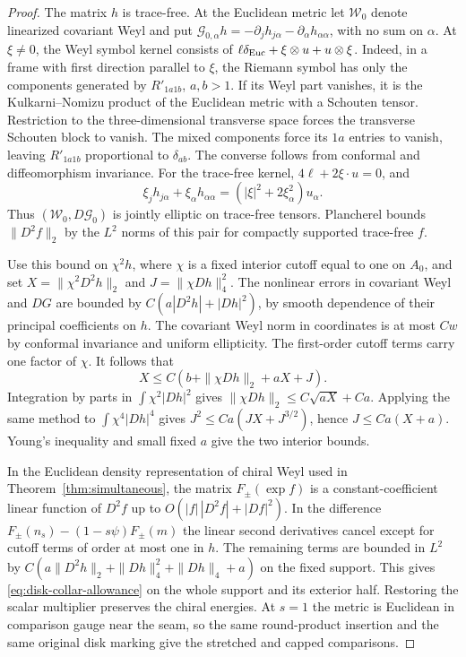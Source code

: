 \begin{proof}
The matrix \(h\) is trace-free. At the Euclidean metric let
\(\mathcal W_0\) denote linearized covariant Weyl and put
\(\mathcal G_{0,\alpha}h=-\partial_jh_{j\alpha}
-\partial_\alpha h_{\alpha\alpha}\), with no sum on \(\alpha\).
At \(\xi\ne0\), the Weyl symbol kernel consists of
\(\ell\delta_{\rm Euc}+\xi\otimes u+u\otimes\xi\). Indeed, in a frame with
first direction parallel to \(\xi\), the Riemann symbol has only
the components generated by \(R'_{1a1b}\), \(a,b>1\). If its
Weyl part vanishes, it is the Kulkarni--Nomizu product of the
Euclidean metric with a Schouten tensor. Restriction to the
three-dimensional transverse space forces the transverse
Schouten block to vanish. The mixed components force its
\(1a\) entries to vanish, leaving \(R'_{1a1b}\) proportional to
\(\delta_{ab}\). The converse follows from conformal and
diffeomorphism invariance. For the trace-free kernel,
\(4\ell+2\xi\cdot u=0\), and
\[
 \xi_j h_{j\alpha}+\xi_\alpha h_{\alpha\alpha}
 =(|\xi|^2+2\xi_\alpha^2)u_\alpha .
\]
Thus \((\mathcal W_0,D\mathcal G_0)\) is jointly elliptic on
trace-free tensors. Plancherel bounds \(\|D^2f\|_2\) by the
\(L^2\) norms of this pair for compactly supported trace-free \(f\).

Use this bound on \(\chi^2h\), where \(\chi\) is a fixed
interior cutoff equal to one on \(A_0\), and set
\(X=\|\chi^2D^2h\|_2\) and \(J=\|\chi Dh\|_4^2\).
The nonlinear errors in covariant Weyl and \(DG\) are bounded
by \(C(a|D^2h|+|Dh|^2)\), by smooth dependence of their
principal coefficients on \(h\). The covariant Weyl norm in
coordinates is at most \(Cw\) by conformal invariance and
uniform ellipticity. The first-order cutoff terms carry one
factor of \(\chi\). It follows that
\[
 X\le C(b+\|\chi Dh\|_2+aX+J).
\]
Integration by parts in \(\int\chi^2|Dh|^2\) gives
\(\|\chi Dh\|_2\le C\sqrt{aX}+Ca\). Applying the same method
to \(\int\chi^4|Dh|^4\) gives
\(J^2\le Ca(JX+J^{3/2})\), hence \(J\le Ca(X+a)\).
Young's inequality and small fixed \(a\) give the two
interior bounds.

In the Euclidean density representation of chiral Weyl
used in Theorem~\ref{thm:simultaneous}, the matrix
\(F_\pm(\exp f)\) is a constant-coefficient linear function
of \(D^2f\) up to \(O(|f|\,|D^2f|+|Df|^2)\). In the
difference \(F_\pm(n_s)-(1-s\psi)F_\pm(m)\) the linear
second derivatives cancel except for cutoff terms of order
at most one in \(h\). The remaining terms are bounded in
\(L^2\) by \(C(a\|D^2h\|_2+\|Dh\|_4^2+\|Dh\|_4+a)\) on
the fixed support. This gives \eqref{eq:disk-collar-allowance}
on the whole support and its exterior half. Restoring the
scalar multiplier preserves the chiral energies. At \(s=1\)
the metric is Euclidean in comparison gauge near the seam,
so the same round-product insertion and the same original
disk marking give the stretched and capped comparisons.
\end{proof}

